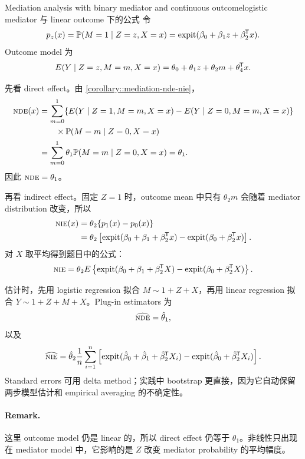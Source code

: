 \begin{exercisesolution}{Mediation analysis with binary mediator and continuous outcome}{logistic mediator 与 linear outcome 下的公式}
令
\[
p_z(x)=\mathbb{P}(M=1\mid Z=z,X=x)
=
\textup{expit}(\beta_0+\beta_1z+\beta_2^{\mkern-1.5mu\mathsf{T}} x).
\]
Outcome model 为
\[
E(Y\mid Z=z,M=m,X=x)
=
\theta_0+\theta_1z+\theta_2m+\theta_4^{\mkern-1.5mu\mathsf{T}} x.
\]

先看 direct effect。由 \cref{corollary::mediation-nde-nie}，
\begin{align*}
\textsc{nde}(x)
&=
\sum_{m=0}^1
\{E(Y\mid Z=1,M=m,X=x)-E(Y\mid Z=0,M=m,X=x)\}\\
&\qquad {}\times \mathbb{P}(M=m\mid Z=0,X=x)\\
&=
\sum_{m=0}^1 \theta_1\mathbb{P}(M=m\mid Z=0,X=x)
=\theta_1.
\end{align*}
因此 $\textsc{nde}=\theta_1$。

再看 indirect effect。固定 $Z=1$ 时，outcome mean 中只有 $\theta_2 m$ 会随着 mediator distribution 改变，所以
\begin{align*}
\textsc{nie}(x)
&=
\theta_2\{p_1(x)-p_0(x)\}\\
&=
\theta_2\left[
\textup{expit}(\beta_0+\beta_1+\beta_2^{\mkern-1.5mu\mathsf{T}} x)
-
\textup{expit}(\beta_0+\beta_2^{\mkern-1.5mu\mathsf{T}} x)
\right].
\end{align*}
对 $X$ 取平均得到题目中的公式：
\[
\textsc{nie}
=
\theta_2 E\left\{
\textup{expit}(\beta_0+\beta_1+\beta_2^{\mkern-1.5mu\mathsf{T}} X)
-
\textup{expit}(\beta_0+\beta_2^{\mkern-1.5mu\mathsf{T}} X)
\right\}.
\]

估计时，先用 logistic regression 拟合 $M\sim 1+Z+X$，再用 linear regression 拟合 $Y\sim 1+Z+M+X$。Plug-in estimators 为
\[
\widehat{\textsc{nde}}=\hat\theta_1,
\]
以及
\[
\widehat{\textsc{nie}}
=
\hat\theta_2\frac{1}{n}\sum_{i=1}^n
\left[
\textup{expit}(\hat\beta_0+\hat\beta_1+\hat\beta_2^{\mkern-1.5mu\mathsf{T}} X_i)
-
\textup{expit}(\hat\beta_0+\hat\beta_2^{\mkern-1.5mu\mathsf{T}} X_i)
\right].
\]
Standard errors 可用 delta method；实践中 bootstrap 更直接，因为它自动保留两步模型估计和 empirical averaging 的不确定性。

\paragraph{Remark.}
这里 outcome model 仍是 linear 的，所以 direct effect 仍等于 $\theta_1$。非线性只出现在 mediator model 中，它影响的是 $Z$ 改变 mediator probability 的平均幅度。
\end{exercisesolution}

